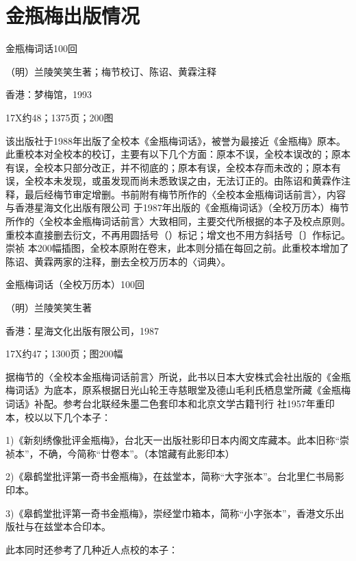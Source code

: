 %

\chapter*{金瓶梅出版情况}

金瓶梅词话100回

（明）兰陵笑笑生著；梅节校订、陈诏、黄霖注释

香港：梦梅馆，1993

17X约48；1375页；200图

该出版社于1988年出版了全校本《金瓶梅词话》，被誉为最接近《金瓶梅》原本。此重校本对全校本的校订，主要有以下几个方面：原本不误，全校本误改的；原本有误，全校本只部分改正，并不彻底的；原本有误，全校本存而未改的；原本有误，全校本未发现，或虽发现而尚未悉致误之由，无法订正的。由陈诏和黄霖作注释，最后经梅节审定增删。书前附有梅节所作的〈全校本金瓶梅词话前言〉，内容与香港星海文化出版有限公司 于1987年出版的《金瓶梅词话》（全校万历本）梅节所作的〈全校本金瓶梅词话前言〉大致相同，主要交代所根据的本子及校点原则。重校本直接删去衍文，不再用圆括号（）标记；增文也不用方斜括号〔〕作标记。崇祯 本200幅插图，全校本原附在卷末，此本则分插在每回之前。此重校本增加了陈诏、黄霖两家的注释，删去全校万历本的〈词典〉。




金瓶梅词话（全校万历本）100回

（明）兰陵笑笑生著

香港：星海文化出版有限公司，1987

17X约47；1300页；图200幅

据梅节的〈全校本金瓶梅词话前言〉所说，此书以日本大安株式会社出版的《金瓶梅词话》为底本，原系根据日光山轮王寺慈眼堂及德山毛利氏栖息堂所藏《金瓶梅词话》补配。参考台北联经朱墨二色套印本和北京文学古籍刊行 社1957年重印本，校以以下几个本子：

1)《新刻绣像批评金瓶梅》，台北天一出版社影印日本内阁文库藏本。此本旧称“崇祯本”，不确，今简称“廿卷本”。（本馆藏有此影印本）

2)《皋鹤堂批评第一奇书金瓶梅》，在兹堂本，简称“大字张本”。台北里仁书局影印本。

3)《皋鹤堂批评第一奇书金瓶梅》，崇经堂巾箱本，简称“小字张本”，香港文乐出版社与在兹堂本合印本。

此本同时还参考了几种近人点校的本子：

